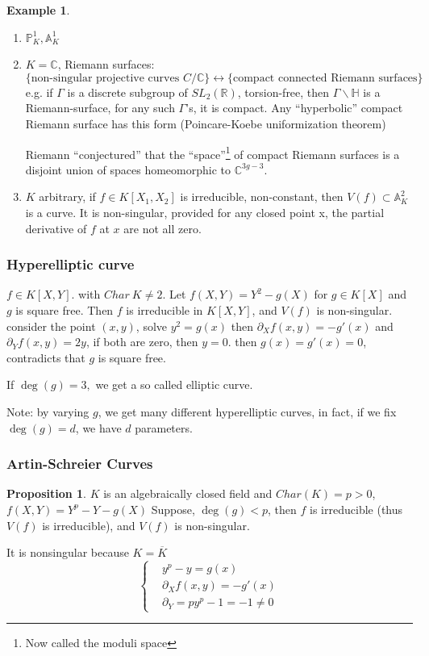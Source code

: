 \documentclass[11pt]{article}
\theoremstyle{definition}
\newtheorem{prop}[thm]{Proposition}
\newtheorem{ex}[thm]{Example}
\newcommand{\affn}{\mathbb A}
\newcommand{\proj}{\mathbb P}
\newcommand{\reals}{\mathbb R}
\newcommand{\cplx}{\mathbb C}
\newcommand{\pd}{\partial}
\newcommand{\llrta}{\longleftrightarrow}
\begin{document}
\begin{ex}\ 
\begin{enumerate}[label=(\arabic*)]
\item $\proj^1_K,\affn^1_K$
\item $K=\cplx$, Riemann surfaces: 
$$
\{\text{non-singular projective curves } C/\cplx \}\llrta\{\text{compact connected Riemann surfaces}\}
$$
e.g. if $\Gamma$ is a discrete subgroup of $SL_2(\reals)$, torsion-free, then $\Gamma\backslash \mathbb{H}$ is a Riemann-surface, for any such $\Gamma$'s, it is compact. Any ``hyperbolic'' compact Riemann surface has this form (Poincare-Koebe uniformization theorem)

Riemann ``conjectured'' that the ``space''\footnote{Now called the moduli space} of compact Riemann surfaces is a disjoint union of spaces homeomorphic to $\cplx^{3g-3}$.
\item $K$ arbitrary, if $f\in K[X_1,X_2]$ is irreducible, non-constant, then $V(f)\subset \affn^2_K$ is a curve. It is non-singular, provided for any closed point x, the partial derivative of $f$ at $x$ are not all zero.
\end{enumerate}
\end{ex}
\subsubsection{Hyperelliptic curve} $f\in K[X,Y]$. with $Char\ K\neq 2$. Let $f(X,Y)=Y^2-g(X)$ for $g\in K[X]$ and $g$ is square free. Then $f$ is  irreducible in $K[X,Y]$, and $V(f)$ is non-singular. consider the point $(x,y)$, solve $y^2=g(x)$ then $\pd_X f(x,y)=-g'(x)$ and $\pd_Y f(x,y)=2y$, if both are zero, then $y=0$. then $g(x)=g'(x)=0$, contradicts that $g$
is square free.

If $\deg(g)=3,$ we get a so called elliptic curve.

Note: by varying $g$, we get many different hyperelliptic curves, in fact, if we fix $\deg(g)=d$, we have $d$ parameters. 
\subsubsection{Artin-Schreier Curves}
\begin{prop}
$K$ is an algebraically closed field and
$Char(K)=p> 0$, $f(X,Y)=Y^p-Y-g(X)$
Suppose, $\deg(g)< p$, then $f$ is irreducible (thus $V(f)$ is irreducible), and $V(f)$ is non-singular.
\end{prop}
It is nonsingular  because $K=\overline{K}$
$$
\left\{
\begin{aligned}
& y^p-y=g(x)\\
& \pd_Xf(x,y)=-g'(x)\\
& \pd_Y= p y^p-1=-1\neq 0
\end{aligned}
\right.
$$
\end{document}
